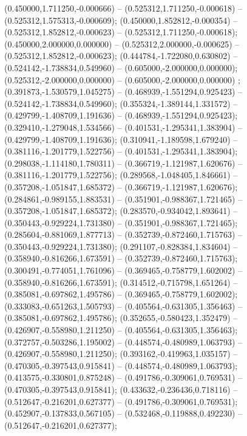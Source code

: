  (0.450000,1.711250,-0.000666) -- (0.525312,1.711250,-0.000618) -- (0.525312,1.575313,-0.000609);
 (0.450000,1.852812,-0.000354) -- (0.525312,1.852812,-0.000623) -- (0.525312,1.711250,-0.000618);
 (0.450000,2.000000,0.000000) -- (0.525312,2.000000,-0.000625) -- (0.525312,1.852812,-0.000623);
 (0.444784,-1.722080,0.630802) -- (0.524142,-1.738834,0.549960) -- (0.605000,-2.000000,0.000000);
 (0.525312,-2.000000,0.000000) -- (0.605000,-2.000000,0.000000) ;
 (0.391873,-1.530579,1.045275) -- (0.468939,-1.551294,0.925423) -- (0.524142,-1.738834,0.549960);
 (0.355324,-1.389144,1.331572) -- (0.429799,-1.408709,1.191636) -- (0.468939,-1.551294,0.925423);
 (0.329410,-1.279048,1.534566) -- (0.401531,-1.295341,1.383904) -- (0.429799,-1.408709,1.191636);
 (0.310941,-1.189598,1.679240) -- (0.381116,-1.201779,1.522756) -- (0.401531,-1.295341,1.383904);
 (0.298038,-1.114180,1.780311) -- (0.366719,-1.121987,1.620676) -- (0.381116,-1.201779,1.522756);
 (0.289568,-1.048405,1.846661) -- (0.357208,-1.051847,1.685372) -- (0.366719,-1.121987,1.620676);
 (0.284861,-0.989155,1.883531) -- (0.351901,-0.988367,1.721465) -- (0.357208,-1.051847,1.685372);
 (0.283570,-0.934042,1.893641) -- (0.350443,-0.929224,1.731380) -- (0.351901,-0.988367,1.721465);
 (0.285604,-0.881069,1.877713) -- (0.352739,-0.872460,1.715763) -- (0.350443,-0.929224,1.731380);
 (0.291107,-0.828384,1.834604) -- (0.358940,-0.816266,1.673591) -- (0.352739,-0.872460,1.715763);
 (0.300491,-0.774051,1.761096) -- (0.369465,-0.758779,1.602002) -- (0.358940,-0.816266,1.673591);
 (0.314512,-0.715798,1.651264) -- (0.385081,-0.697862,1.495786) -- (0.369465,-0.758779,1.602002);
 (0.333083,-0.651263,1.505793) -- (0.405564,-0.631305,1.356463) -- (0.385081,-0.697862,1.495786);
 (0.352655,-0.580423,1.352479) -- (0.426907,-0.558980,1.211250) -- (0.405564,-0.631305,1.356463);
 (0.372757,-0.503286,1.195002) -- (0.448574,-0.480989,1.063793) -- (0.426907,-0.558980,1.211250);
 (0.393162,-0.419963,1.035157) -- (0.470305,-0.397543,0.915841) -- (0.448574,-0.480989,1.063793);
 (0.413575,-0.330801,0.875248) -- (0.491786,-0.309061,0.769531) -- (0.470305,-0.397543,0.915841);
 (0.433632,-0.236436,0.718116) -- (0.512647,-0.216201,0.627377) -- (0.491786,-0.309061,0.769531);
 (0.452907,-0.137833,0.567105) -- (0.532468,-0.119888,0.492230) -- (0.512647,-0.216201,0.627377);
